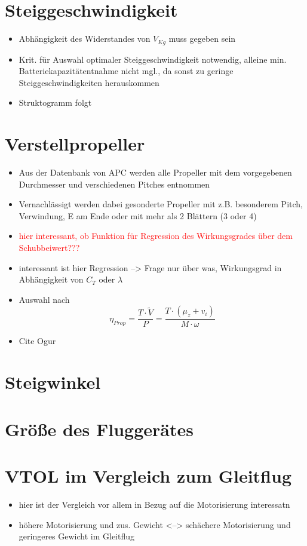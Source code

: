 \section{Steiggeschwindigkeit}
\label{sec:steiggeschwindigkeit}

\begin{itemize}
	\item Abhängigkeit des Widerstandes von \ensuremath{V_{Kg}} muss gegeben sein
	\item Krit. für Auswahl optimaler Steiggeschwindigkeit notwendig, alleine min. Batteriekapazitätentnahme nicht mgl., da sonst zu geringe Steiggeschwindigkeiten herauskommen
	\item Struktogramm folgt
\end{itemize}

\section{Verstellpropeller}
\label{sec:verstellprop}

\begin{itemize}
	\item Aus der Datenbank von APC werden alle Propeller mit dem vorgegebenen Durchmesser und verschiedenen Pitches entnommen
	\item Vernachlässigt werden dabei gesonderte Propeller mit z.B. besonderem Pitch, Verwindung, E am Ende oder mit mehr als 2 Blättern (3 oder 4)
	\item \textcolor{red}{hier interessant, ob Funktion für Regression des Wirkungsgrades über dem Schubbeiwert???}
	\item interessant ist hier Regression --> Frage nur über was, Wirkungsgrad in Abhängigkeit von \ensuremath{C_T} oder \ensuremath{\lambda}
	\item Auswahl nach 
	\begin{equation}
		\eta_{Prop} = \frac{T\cdot\tilde{V}}{P} = \frac{T\cdot (\mu_z + v_i)}{M\cdot \omega}
	\end{equation}
	\item Cite Ogur
\end{itemize}

\section{Steigwinkel}
\label{sec:steigwinkel}

\section{Größe des Fluggerätes}
\label{sec:groesse}

\section{VTOL im Vergleich zum Gleitflug}
\label{sec:vtol_vs_gleitflug}
\begin{itemize}
	\item hier ist der Vergleich vor allem in Bezug auf die Motorisierung interessatn
	\item höhere Motorisierung und zus. Gewicht <--> schächere Motorisierung und geringeres Gewicht im Gleitflug
\end{itemize}